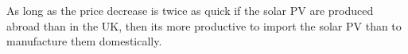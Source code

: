 \documentclass[11pt]{article}
\begin{document}
\noindent As long as the price decrease is twice as quick if the solar PV are produced abroad than in the UK, then its more productive to import the solar PV than to manufacture them domestically.












  




\small
\renewcommand\bibname{References}


\normalsize
\end{document}

